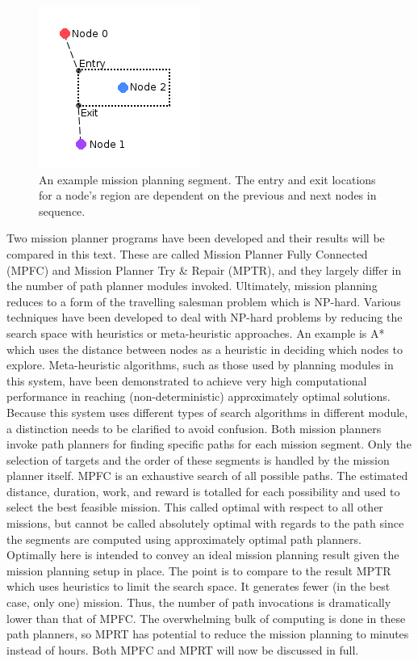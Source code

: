 \documentclass{tamuccthesis}
\begin{document}
\begin{figure}[h]
\includegraphics[]{segment_example.png}
\caption{An example mission planning segment. The entry and exit locations for a node's region are dependent on the previous and next nodes in sequence.}
\label{segment_example}
\end{figure}

Two mission planner programs have been developed and their results will be compared in this text. These are called Mission Planner Fully Connected (MPFC) and Mission Planner Try \& Repair (MPTR), and they largely differ in the number of path planner modules invoked. Ultimately, mission planning reduces to a form of the travelling salesman problem which is NP-hard. Various techniques have been developed to deal with NP-hard problems by reducing the search space with heuristics or meta-heuristic approaches. An example is A* which uses the distance between nodes as a heuristic in deciding which nodes to explore. Meta-heuristic algorithms, such as those used by planning modules in this system, have been demonstrated to achieve very high computational performance in reaching (non-deterministic) approximately optimal solutions. Because this system uses different types of search algorithms in different module, a distinction needs to be clarified to avoid confusion. Both mission planners invoke path planners for finding specific paths for each mission segment. Only the selection of targets and the order of these segments is handled by the mission planner itself. MPFC is an exhaustive search of all possible paths. The estimated distance, duration, work, and reward is totalled for each possibility and used to select the best feasible mission. This called optimal with respect to all other missions, but cannot be called absolutely optimal with regards to the path since the segments are computed using approximately optimal path planners. Optimally here is intended to convey an ideal mission planning result given the mission planning setup in place. The point is to compare to the result MPTR which uses heuristics to limit the search space. It generates fewer (in the best case, only one) mission. Thus, the number of path invocations is dramatically lower than that of MPFC. The overwhelming bulk of computing is done in these path planners, so MPRT has potential to reduce the mission planning to minutes instead of hours. Both MPFC and MPRT will now be discussed in full.
\end{document}
